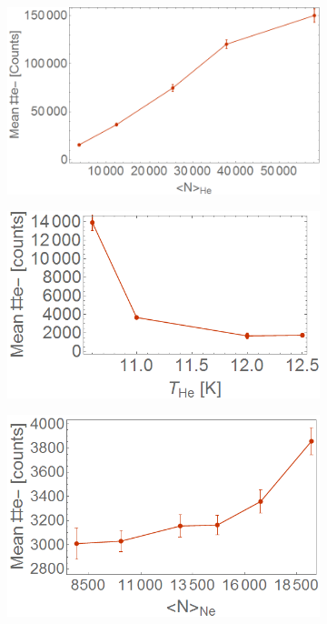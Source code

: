 \begin{figure}[h!]
\begin{subfigure}[l]{0.32\textwidth}
\includegraphics[width=1\textwidth]{../Images/results/NI_He_Dropletsize/MeanElec.png} 
\end{subfigure}
\begin{subfigure}[l]{0.32\textwidth}
\includegraphics[width=1\textwidth]{../Images/results/Mir_He_Dropletsize/Meanelec.png} 
\end{subfigure}
\begin{subfigure}[l]{0.32\textwidth}
\includegraphics[width=1\textwidth]{../Images/results/MIR_Ne_DropletSize/MeanElec.png} 
\end{subfigure}


\end{figure}
